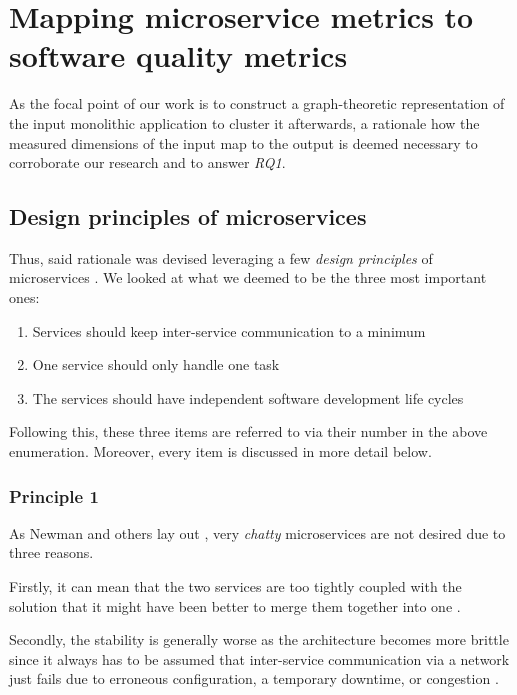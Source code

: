\documentclass[12pt,a4paper]{report}
\begin{document}
\chapter{Mapping microservice metrics to software quality metrics} \label{chap:rationale}

As the focal point of our work is to construct a graph-theoretic representation
of the input monolithic application to cluster it afterwards,
a rationale how the measured dimensions of the input map to the output
is deemed necessary to corroborate our research and to answer \textit{RQ1}.



\section{Design principles of microservices}

Thus, said rationale was devised leveraging a few \textit{design principles}
of microservices \cite{ms-design-principles, ms-fowler, newman2015building}.
We looked at what we deemed to be the three most important ones:
\begin{enumerate}
  \item Services should keep inter-service communication to a minimum
  \item One service should only handle one task
  \item The services should have independent software development life cycles
\end{enumerate}
Following this, these three items are referred to via their number in the
above enumeration. Moreover, every item is discussed in more detail below.


\subsection{Principle 1}
As Newman and others lay out \cite{newman2015building, alshuqayran2016systematic},
very \textit{chatty} microservices are not desired due to three reasons.

Firstly, it can mean that the two services are too tightly coupled with
the solution that it might have been better to merge them together into one
\cite{newman2015building}.

Secondly, the stability is generally worse as the architecture becomes
more brittle since it always has to be assumed that inter-service communication
via a network just fails due to erroneous configuration, a temporary downtime,
or congestion \cite{newman2015building, alshuqayran2016systematic}.
\end{document}
